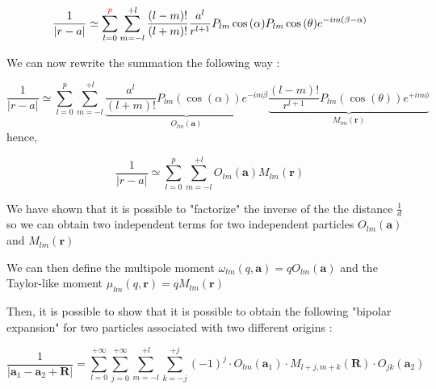 \documentclass[12pt,twoside,a4paper]{report}
\begin{document}
	\begin{equation}
	\frac{1}{|r - a|} \simeq \sum\limits_{l=0}^{\textcolor{red}{p}} \sum\limits_{m = -l}^{+l} \frac{(l-m)!}{(l+m)!} \frac{a^l}{r^{l+1}} P_{lm}\cos{(\alpha)}P_{lm}\cos{(\theta)}e^{-im(\beta - \alpha)}
	\end{equation}
	
	We can now rewrite the summation the following way :
	
		\begin{equation}
	\frac{1}{|r - a|} \simeq \sum\limits_{l=0}^{p} \sum\limits_{m = -l}^{+l}
	\underbrace{\frac{a^l}{(l+m)!} P_{lm}(\cos(\alpha))e^{-im\beta}} _{O_{lm}(\textbf{a})}
    \underbrace{\frac{(l-m)!}{r^{l+1}} P_{lm}(\cos(\theta))e^{+im\phi}} _{M_{lm}(\textbf{r})}
	\end{equation}
	hence,
	
		\begin{equation}
	\frac{1}{|r - a|} \simeq \sum\limits_{l=0}^{p} \sum\limits_{m = -l}^{+l}
	{O_{lm}(\textbf{a})}
    {M_{lm}(\textbf{r})}
	\end{equation}
	
	
	We have shown that it is possible to "factorize" the inverse of the the distance $\frac{1}{d}$ so we can obtain two independent terms for two independent particles ${O_{lm}(\textbf{a})}$ and ${M_{lm}(\textbf{r})}$ 


	We can then define the multipole moment $\omega_{lm}(q,\textbf{a}) = q O_{lm}(\textbf{a})$ and the Taylor-like moment $\mu_{lm}(q,\textbf{r}) = q M_{lm}(\textbf{r})$
	
	Then, it is possible to show that it is possible to obtain the following "bipolar expansion" for two particles associated with two different origins :
	
    \begin{equation}
    \frac{1}{|\textbf{a}_1 - \textbf{a}_2 + \textbf{R}|} = 
    \sum\limits_{l=0}^{+\infty}
    \sum\limits_{j=0}^{+\infty}
    \sum\limits_{m=-l}^{+l}
    \sum\limits_{k=-j}^{+j}
    (-1)^j \cdot O_{lm}(\textbf{a}_1) \cdot M_{l+j,m+k}(\textbf{R}) \cdot O_{jk}(\textbf{a}_2)
    \end{equation}
\end{document}
